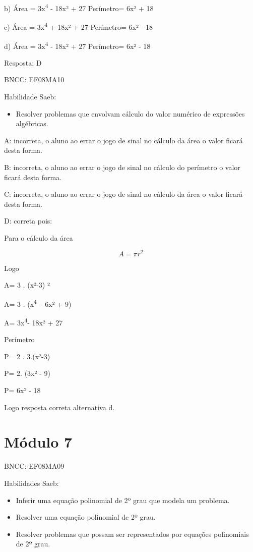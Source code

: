 b) Área = 3x\textsuperscript{4} - 18x² + 27 Perímetro= 6x² + 18

c) Área = 3x\textsuperscript{4} + 18x² + 27 Perímetro= 6x² - 18

d) Área = 3x\textsuperscript{4} - 18x² + 27 Perímetro= 6x² - 18

Resposta: D

BNCC: EF08MA10

Habilidade Saeb:

\begin{itemize}
\tightlist
\item
  Resolver problemas que envolvam cálculo do valor numérico de
  expressões algébricas.
\end{itemize}

A: incorreta, o aluno ao errar o jogo de sinal no cálculo da área o
valor ficará desta forma.

B: incorreta, o aluno ao errar o jogo de sinal no cálculo do perímetro o
valor ficará desta forma.

C: incorreta, o aluno ao errar o jogo de sinal no cálculo da área o
valor ficará desta forma.

D: correta pois:

Para o cálculo da área

\[A = \pi r^{2}\]

Logo

A= 3 . (x²-3) ²

A= 3 . (x\textsuperscript{4} -- 6x² + 9)

A= 3x\textsuperscript{4}- 18x² + 27

Perímetro


P= 2 . 3.(x²-3)

P= 2. (3x² - 9)

P= 6x² - 18

Logo resposta correta alternativa d.

\section{Módulo 7}

BNCC: EF08MA09

Habilidades Saeb:

\begin{itemize}
\item
  Inferir uma equação polinomial de 2º grau que modela um problema.
\item
  Resolver uma equação polinomial de 2º grau.
\item
  Resolver problemas que possam ser representados por equações
  polinomiais de 2º grau.
\end{itemize}

